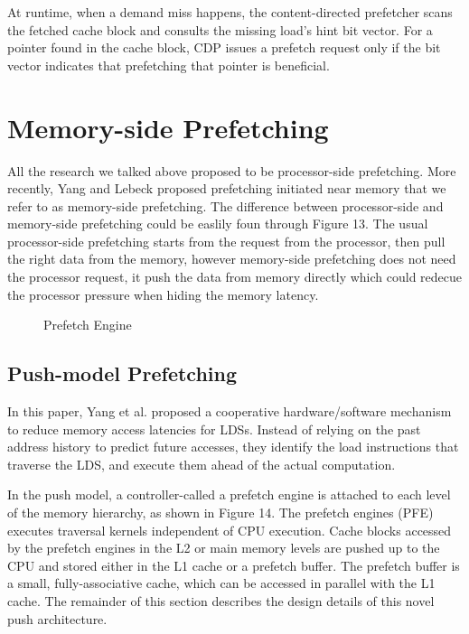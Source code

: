 \documentclass{acm_proc_article-sp}
\begin{document}
At runtime, when a demand miss happens, the content-directed
prefetcher scans the fetched cache block and consults the missing
load’s hint bit vector. For a pointer found in the cache block, CDP
issues a prefetch request only if the bit vector indicates that
prefetching that pointer is beneficial. 


\section{Memory-side Prefetching}

All the research we talked above proposed to be processor-side
prefetching. More recently, Yang and Lebeck proposed prefetching
initiated near memory that we refer to as memory-side
prefetching.\cite{Yang:2002:PMH:646349.690705}
\cite{Hughes:2005:MPL:1066486.1066491} 
The difference between processor-side and memory-side prefetching
could be easlily foun through Figure 13. The usual processor-side
prefetching starts from the request from the processor, then pull the
right data from the memory, however memory-side prefetching does not
need the processor request, it push the data from memory directly
which could redecue the processor pressure when hiding the memory
latency. 

\begin{figure}
\centering
{}
\caption{Prefetch Engine}
\end{figure}

\subsection{Push-model Prefetching}

In this paper, Yang et al. proposed a cooperative hardware/software mechanism
to reduce memory access latencies for
LDSs.\cite{Yang:2002:PMH:646349.690705} Instead 
of relying on the past address history to predict future accesses,
they identify the load instructions that traverse the LDS, and execute
them ahead of the actual computation. 

In the push model, a controller-called a prefetch engine
is attached to each level of the memory hierarchy, as shown
in Figure 14. The prefetch engines (PFE) executes traversal kernels
independent of CPU execution. Cache blocks 
accessed by the prefetch engines in the L2 or main memory levels are
pushed up to the CPU and stored either in 
the L1 cache or a prefetch buffer. The prefetch buffer is
a small, fully-associative cache, which can be accessed in
parallel with the L1 cache. The remainder of this section
describes the design details of this novel push architecture.
\end{document}
